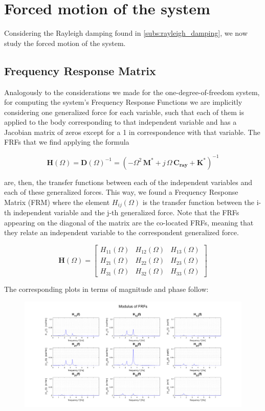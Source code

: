\documentclass[a4paper,12pt,oneside]{article}
\begin{document}
\section{Forced motion of the system}

Considering the Rayleigh damping found in \ref{subs:rayleigh_damping}, we now study the forced motion of the system.

\subsection{Frequency Response Matrix}
\label{subs:frm}

Analogously to the considerations we made for the one-degree-of-freedom system, for computing the system's Frequency Response Functions we are implicitly considering one generalized force for each variable, such that each of them is applied to the body corresponding to that independent variable and has a Jacobian matrix of zeros except for a 1 in correspondence with that variable. The FRFs that we find applying the formula

\[
	\mathbf{H}(\Omega) = \mathbf{D}(\Omega)^{-1} =
		(- \Omega^2 \, \mathbf{M^*} + j \, \Omega \, \mathbf{C_{ray}} + \mathbf{K^*})^{-1}
\]

are, then, the transfer functions between each of the independent variables and each of these generalized forces. This way, we found a Frequency Response Matrix (FRM) where the element $ H_{ij}(\Omega) $ is the transfer function between the i-th independent variable and the j-th generalized force. Note that the FRFs appearing on the diagonal of the matrix are the co-located FRFs, meaning that they relate an independent variable to the correspondent generalized force.

\[
	\mathbf{H}(\Omega) = \begin{bmatrix}
								H_{11}(\Omega)	& H_{12}(\Omega)	& H_{13}(\Omega) \\
								H_{21}(\Omega)	& H_{22}(\Omega)	& H_{23}(\Omega) \\
								H_{31}(\Omega)	& H_{32}(\Omega)	& H_{33}(\Omega)
							\end{bmatrix}
\]

\vspace{10pt}

The corresponding plots in terms of magnitude and phase follow:

\begin{figure}[h]
	\hspace{-70pt}
	\includegraphics[scale=0.4]{frfs_modulus}
\end{figure}
\end{document}
